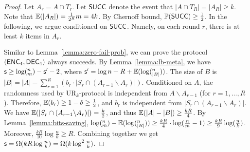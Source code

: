 \begin{proof}
  Let $A_r=A\cap T_r$. 
  Let $\textsf{SUCC}$ denote the event that $|A\cap T_R|=|A_R|\ge k$. 
  Note that $\operatorname*{\mathbb{E}}(|A_R|)=\frac{1}{2^R}m=4k$. By Chernoff bound, $\operatorname*{\mathbb{P}}(\textsf{SUCC})\ge \frac{1}{2}$. 
  In the following, we argue conditioned on $\textsf{SUCC}$. Namely, on each round $r$, there is at least $k$ items in $A_r$.  
  
  Similar to Lemma~\ref{lemma:zero-fail-prob}, we can prove the protocol $(\textsf{ENC}_4,\textsf{DEC}_4)$ always succeeds. 
  By Lemma~\ref{lemma:lb-meta}, we have $\textsf{s}\ge \log (^n_m) - \textsf{s}' -2$, where $\textsf{s}'=\log n + R+ \operatorname*{\mathbb{E}}(\log (^n_{|B|}))$. 
  The size of $B$ is $|B|=|A|-\sum_{r=1}^{R}{(b_r \cdot |S_r \cap (A_{r-1}\backslash A_r)|)}$.
  Conditioned on $A$, the randomness used by UR$_k$-protocol is independent from $A\backslash A_{r-1}$ (for $r=1, \ldots, R$).
  Therefore, $\operatorname*{\mathbb{E}}(b_r)\ge 1-\delta\ge \frac{1}{2}$, and $b_r$ is independent from $|S_r \cap (A_{r-1}\backslash A_r)|$. 
  We have $\operatorname*{\mathbb{E}}(|S_r \cap (A_{r-1}\backslash A_r)|)=\frac{k}{2}$, and thus $\operatorname*{\mathbb{E}}(|A|-|B|)\ge \frac{kR}{4}$. 
  By Lemma~\ref{lemma:bits-saving}, $\log (^n_m)-\operatorname*{\mathbb{E}}(\log (^n_{|B|}))\ge \frac{kR}{4}\cdot \log (\frac{n}{m}-1) \ge \frac{kR}{9}\log (\frac{n}{k})$.
  Moreover, $\frac{kR}{10}\log \frac{n}{k}\ge R$.  
  Combining together we get $\textsf{s} = \Omega(kR\log\frac{n}{k}) = \Omega(k\log^2 \frac{n}{k} )$.
\end{proof}
